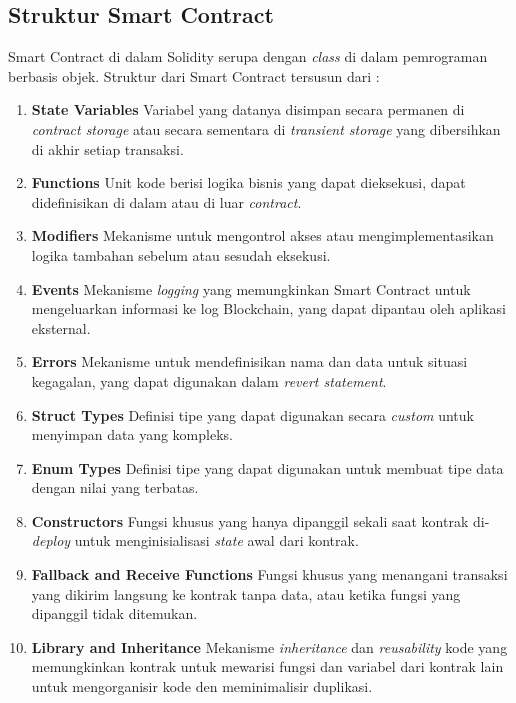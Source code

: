 \subsection{Struktur Smart Contract}
\label{subsec:struktur-smart-contract}

Smart Contract di dalam Solidity serupa dengan \textit{class} di dalam pemrograman berbasis objek. Struktur dari Smart Contract tersusun dari \parencite{solidity_structure}:

\begin{enumerate}
	\item \textbf{State Variables} \newline
	      Variabel yang datanya disimpan secara permanen di \textit{contract storage} atau secara sementara di \textit{transient storage} yang dibersihkan di akhir setiap transaksi.
	\item \textbf{Functions} \newline
	      Unit kode berisi logika bisnis yang dapat dieksekusi, dapat didefinisikan di dalam atau di luar \textit{contract}.
	\item \textbf{Modifiers} \newline
	      Mekanisme untuk mengontrol akses atau mengimplementasikan logika tambahan sebelum atau sesudah eksekusi.
	\item \textbf{Events} \newline
	      Mekanisme \textit{logging} yang memungkinkan Smart Contract untuk mengeluarkan informasi ke log Blockchain, yang dapat dipantau oleh aplikasi eksternal.
	\item \textbf{Errors} \newline
	      Mekanisme untuk mendefinisikan nama dan data untuk situasi kegagalan, yang dapat digunakan dalam \textit{revert statement}.
	\item \textbf{Struct Types} \newline
	      Definisi tipe yang dapat digunakan secara \textit{custom} untuk menyimpan data yang kompleks.
	\item \textbf{Enum Types} \newline
	      Definisi tipe yang dapat digunakan untuk membuat tipe data dengan nilai yang terbatas.
	\item \textbf{Constructors} \newline
	      Fungsi khusus yang hanya dipanggil sekali saat kontrak di-\textit{deploy} untuk menginisialisasi \textit{state} awal dari kontrak.
	\item \textbf{Fallback and Receive Functions} \newline
	      Fungsi khusus yang menangani transaksi yang dikirim langsung ke kontrak tanpa data, atau ketika fungsi yang dipanggil tidak ditemukan.
	\item \textbf{Library and Inheritance} \newline
	      Mekanisme \textit{inheritance} dan \textit{reusability} kode yang memungkinkan kontrak untuk mewarisi fungsi dan variabel dari kontrak lain untuk mengorganisir kode den meminimalisir duplikasi.
\end{enumerate}
